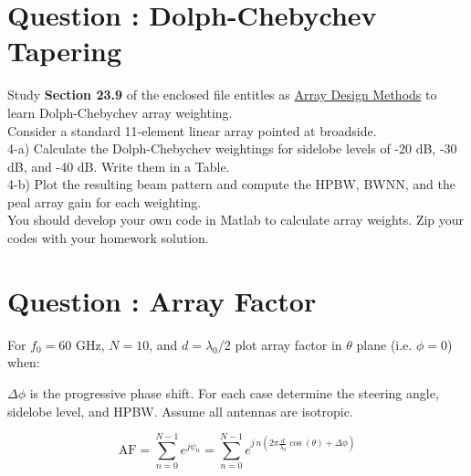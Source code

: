 \documentclass[12pt,onecolumn,a4paper]{article}
\newcommand\question[1][\space]{
	\section[Question \numberstringnum{\thesection}]
	{Question \numberstringnum{\thesection}: #1}
}
\begin{document}
	




\FloatBarrier\question[Dolph-Chebychev Tapering]

{\color{questioncolor}
Study \textbf{Section 23.9} of the enclosed file entitles as \href{https://github.com/MohammadRaziei/phased-array-course/raw/HW02/HW/Array%20Design%20Methods.pdf}{Array Design Methods} to learn Dolph-Chebychev array weighting.\\

Consider a standard 11-element linear array pointed at broadside.\\

4-a) Calculate the Dolph-Chebychev weightings for sidelobe levels of -20 dB, -30 dB, and -40 dB. Write them in a Table.\\

4-b) Plot the resulting beam pattern and compute the HPBW, BWNN, and the peal array gain for each weighting.\\


You should develop your own code in Matlab to calculate array weights. Zip your codes with your homework solution.
}
	


\FloatBarrier\question[Array Factor]

{\color{questioncolor}
For $f_0= 60$ GHz, $N=10$, and $d=\lambda_0/2$ plot array factor in $\theta$ plane (i.e. $\phi=0$) when:

$\Delta\phi$ is the progressive phase shift. For each case determine the steering angle, sidelobe level, and HPBW. Assume all antennas are isotropic.
}




\begin{equation}
	\text{AF} = \sum_{n=0}^{N-1} e^{j \psi_n} = \sum_{n=0}^{N-1} e^{j \, n \left( 2 \pi \frac{d}{\lambda_0} \cos(\theta) + \Delta \phi \right) } 
\end{equation}
\end{document}
